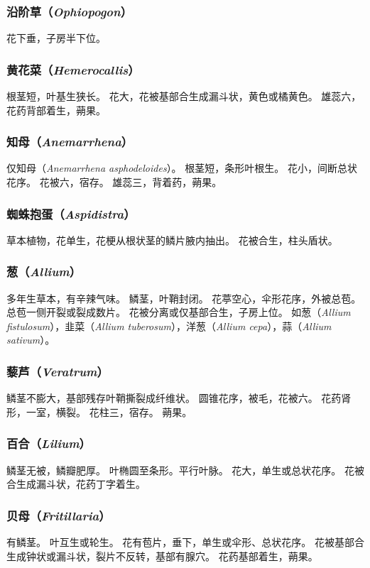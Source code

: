 \documentclass[11pt]{article}
\begin{document}
\begin{sloppypar}
\subsubsection{沿阶草（\textit{Ophiopogon}）}
花下垂，子房半下位。

\subsubsection{黄花菜（\textit{Hemerocallis}）}
根茎短，叶基生狭长。
花大，花被基部合生成漏斗状，黄色或橘黄色。
雄蕊六，花药背部着生，蒴果。

\subsubsection{知母（\textit{Anemarrhena}）}
仅知母（\textit{Anemarrhena asphodeloides}）。
根茎短，条形叶根生。
花小，间断总状花序。
花被六，宿存。
雄蕊三，背着药，蒴果。

\subsubsection{蜘蛛抱蛋（\textit{Aspidistra}）}
草本植物，花单生，花梗从根状茎的鳞片腋内抽出。
花被合生，柱头盾状。

\subsubsection{葱（\textit{Allium}）}
多年生草本，有辛辣气味。
鳞茎，叶鞘封闭。
花葶空心，伞形花序，外被总苞。
总苞一侧开裂或裂成数片。
花被分离或仅基部合生，子房上位。
如葱（\textit{Allium fistulosum}），韭菜（\textit{Allium tuberosum}），洋葱（\textit{Allium cepa}），蒜（\textit{Allium sativum}）。

\subsubsection{藜芦（\textit{Veratrum}）}
鳞茎不膨大，基部残存叶鞘撕裂成纤维状。
圆锥花序，被毛，花被六。
花药肾形，一室，横裂。
花柱三，宿存。
蒴果。

\subsubsection{百合（\textit{Lilium}）}
鳞茎无被，鳞瓣肥厚。
叶椭圆至条形。平行叶脉。
花大，单生或总状花序。
花被合生成漏斗状，花药丁字着生。

\subsubsection{贝母（\textit{Fritillaria}）}
有鳞茎。
叶互生或轮生。
花有苞片，垂下，单生或伞形、总状花序。
花被基部合生成钟状或漏斗状，裂片不反转，基部有腺穴。
花药基部着生，蒴果。


\end{sloppypar}
\end{document}
